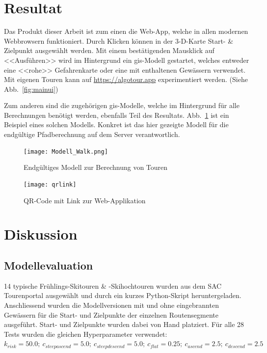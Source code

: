 \section{Resultat}

Das Produkt dieser Arbeit ist zum einen die Web-App, welche in allen modernen Webbrowsern funktioniert. Durch Klicken können in der 3-D-Karte Start- \& Zielpunkt ausgewählt werden. Mit einem bestätigenden Mausklick auf <<Ausführen>> wird im Hintergrund ein \gls{gis}-Modell gestartet, welches entweder eine <<rohe>> Gefahrenkarte oder eine mit enthaltenen Gewässern verwendet. Mit eigenen Touren kann auf \url{https://algotour.app} experimentiert werden. (Siehe Abb.\ \ref{fig:mainui})

Zum anderen sind die zugehörigen \acrshort{gis}-Modelle, welche im Hintergrund für alle Berechnungen benötigt werden, ebenfalls Teil des Resultats. Abb.\ \ref{fig:walkmodel} ist ein Beispiel eines solchen Modells. Konkret ist das hier gezeigte Modell für die endgültige Pfadberechnung auf dem Server verantwortlich.

\begin{figure}[H]
  \centering
  \texttt{[image: Modell\_Walk.png]}
  \caption{Endgültiges Modell zur Berechnung von Touren}\label{fig:walkmodel}
\end{figure}
\begin{figure}[H]
  \centering
  \texttt{[image: qrlink]}
  \caption{QR-Code mit Link zur Web-Applikation}\label{fig:qrlink}
\end{figure}


\clearpage
\section{Diskussion}

\subsection{Modellevaluation}

14 typische Frühlings-Skitouren \& -Skihochtouren wurden aus dem SAC Tourenportal ausgewählt und durch ein kurzes Python-Skript heruntergeladen. Anschliessend wurden die Modellversionen mit und ohne eingebrannten Gewässern für die Start- und Zielpunkte der einzelnen Routensegmente ausgeführt. Start- und Zielpunkte wurden dabei von Hand platziert. Für alle 28 Tests wurden die gleichen Hyperparameter verwendet: \\$k_{risk}={50.0};\ c_{steepascend}={5.0};\ c_{steepdescend}={5.0};\ c_{flat}={0.25};\ c_{ascend}={2.5};\ c_{descend}={2.5}$

